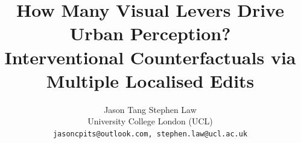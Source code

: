 \documentclass[10pt,twocolumn,letterpaper]{article}
\title{How Many Visual Levers Drive Urban Perception?\\
Interventional Counterfactuals via Multiple Localised Edits}
\author{
Jason Tang \quad Stephen Law\\
University College London (UCL)\\
{\tt\small jasoncpits@outlook.com, stephen.law@ucl.ac.uk}
}
\begin{document}
\maketitle
    






{
    \small
    
    
}

\end{document}

